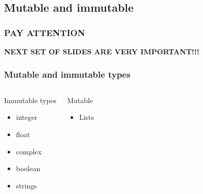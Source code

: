 \documentclass[colorlinks]{beamer}
\begin{document}
\subsection{Mutable and immutable}
\begin{frame}[fragile]\frametitle{PAY ATTENTION}
\begin{block}{}
\centering
\huge
{\color{red}\textbf{NEXT SET OF SLIDES ARE VERY IMPORTANT!!!}}
\end{block}
\end{frame}
\begin{frame}[fragile]\frametitle{Mutable and immutable types}
\begin{columns}[c]
\begin{block}{Immutable types}
\begin{itemize}
    \item integer
\item float
\item complex
\item boolean 
\item strings
\end{itemize}
\end{block}
\begin{block}{Mutable}
\begin{itemize}
    \item Lists
\end{itemize}
\end{block}
\end{columns}
\end{frame}
\end{document}
